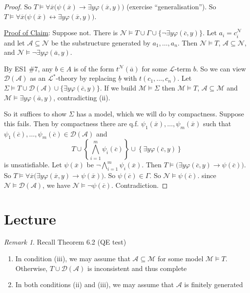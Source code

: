 \documentclass[]{article}
\theoremstyle{custhm}
\theoremstyle{cusdef}
\theoremstyle{custhm}
\theoremstyle{custhm}
\theoremstyle{custhm}
\theoremstyle{ex}
\theoremstyle{custhm}
\theoremstyle{cusdef}
\theoremstyle{remark}
\newtheorem*{remark*}{Remark}
\theoremstyle{remark}
\theoremstyle{numremark}
\renewcommand{\L}{\mathcal{L}}
\newcommand{\M}{\mathcal{M}}
\renewcommand{\phi}{\varphi}
\renewcommand{\bar}{\overline}
\newcommand{\N}{\mathcal{N}}
\newcommand{\A}{\mathcal{A}}
\newcommand{\D}{\mathcal{D}}
\renewcommand{\subset}{\subseteq}
\begin{document}
\begin{proof}
So $T\models \forall \bar{x}\big(\psi(\bar{x}) \rightarrow \exists y \phi(\bar{x},y)\big)$ (exercise ``generalisation''). So $T\models \forall \bar{x}\big(\psi(\bar{x})\leftrightarrow \exists y\phi(\bar{x},y)\big)$.

\underline{Proof of Claim}: Suppose not. There is $\N\models T\cup\Gamma \cup \{\neg \exists y\phi(\bar{c},y)\}$. Let $a_i = c_i^\N$ and let $\A\subset\N$ be the substructure generated by $a_1,\dots,a_n$. Then $\N\models T$, $\A\subset\N$, and $\N\models \neg \exists y\phi(\bar{a},y)$.

By ES1 \#7, any $b \in A$ is of the form $t^\N(\bar{a})$ for some $\L$-term $b$. So we can view $\D(\A)$ as an $\L^\ast$-theory by replacing $\underline{b}$ with $t(c_1,\dots,c_n)$. Let $\Sigma\models T\cup\D(\A)\cup\{\exists y\phi(\bar{c},y)\}$. If we build $\M\models \Sigma$ then $\M\models T$, $\A\subset \M$ and $\M\models \exists y \phi(\bar{a},y)$, contradicting (ii).

So it suffices to show $\Sigma$ has a model, which we will do by compactness. Suppose this fails. Then by compactness there are q.f. $\psi_1(\bar{x}),\dots,\psi_m(\bar{x})$ such that $\psi_1(\bar{c}),\dots,\psi_m(\bar{c})\in\D(\A)$ and $$ T\cup \left\lbrace \bigwedge_{i=1}^{m}\psi_i(\bar{c})\right\rbrace \cup \left\lbrace \exists y \phi(\bar{c},y)\right\rbrace$$ is unsatisfiable. Let $\psi(\bar{x})$ be $\neg \bigwedge_{i=1}^{m}\psi_i(\bar{x})$. Then $T\models \big(\exists y\phi(\bar{c},y)\rightarrow \psi(\bar{c})\big)$. So $T\models \forall \bar{x} \big(\exists y \phi(\bar{x},y)\rightarrow\psi(\bar{x})\big)$. So $\psi(\bar{c})\in \Gamma$. So $\N\models \psi(\bar{c})$. since $\N\models \D(\A)$, we have $\N\models \neg \psi(\bar{c})$. Contradiction.
\end{proof}


\section{Lecture}

\begin{remark*}
Recall Theorem 6.2 (QE test)
\begin{enumerate}[label=\arabic*)]
	\item In condition (iii), we may assume that $\A\subset\M$ for some model $\M\models T$. Otherwise, $T\cup \D(\A)$ is inconsistent and thus complete
	\item In both conditions (ii) and (iii), we may assume that $\A$ is finitely generated
\end{enumerate}
\end{remark*}
\end{document}
